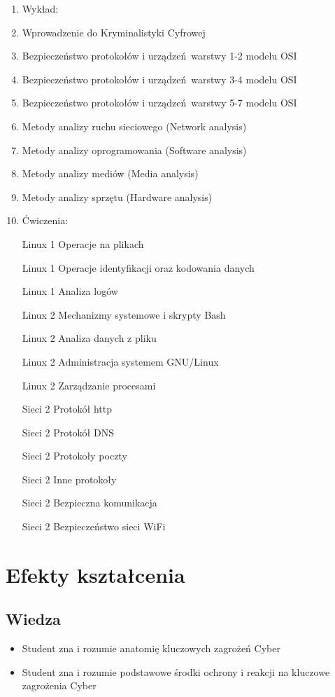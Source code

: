 \documentclass[12pt, a4paper]{article}
\begin{document}
\begin{enumerate}
  \item Wykład:
  \item Wprowadzenie do Kryminalistyki Cyfrowej
  \item Bezpieczeństwo protokołów i urządzeń warstwy 1-2 modelu OSI
  \item Bezpieczeństwo protokołów i urządzeń warstwy 3-4 modelu OSI
  \item Bezpieczeństwo protokołów i urządzeń warstwy 5-7 modelu OSI
  \item Metody analizy ruchu sieciowego (Network analysis)
  \item Metody analizy oprogramowania (Software analysis)
  \item Metody analizy mediów (Media analysis)
  \item Metody analizy sprzętu (Hardware analysis)
  \item Ćwiczenia:
  \item [Linux 1] Operacje na plikach
  \item [Linux 1] Operacje identyfikacji oraz kodowania danych
  \item [Linux 1] Analiza logów
  \item [Linux 2] Mechanizmy systemowe i skrypty Bash
  \item [Linux 2] Analiza danych z pliku
  \item [Linux 2] Administracja systemem GNU/Linux
  \item [Linux 2] Zarządzanie procesami
  \item [Sieci 2] Protokół http
  \item [Sieci 2] Protokół DNS
  \item [Sieci 2] Protokoły poczty
  \item [Sieci 2] Inne protokoły
  \item [Sieci 2] Bezpieczna komunikacja
  \item [Sieci 2] Bezpieczeństwo sieci WiFi
\end{enumerate}

\section{Efekty kształcenia}

\subsection*{Wiedza}
\begin{itemize}
  \item Student zna i rozumie anatomię kluczowych zagrożeń Cyber
  \item Student zna i rozumie podstawowe środki ochrony i reakcji na kluczowe zagrożenia Cyber
\end{itemize}
\end{document}
